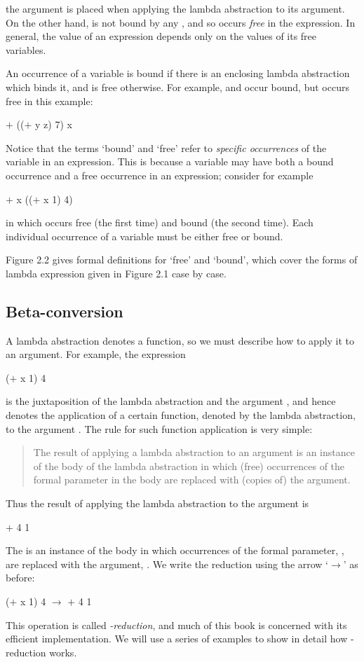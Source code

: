 \noindent the
argument  is placed when applying the lambda abstraction to its argument.
On the other hand,  is not bound by any , and so occurs \textit{free} in the
expression. In general, the value of an expression depends only on the values
of its free variables.

An occurrence of a variable is bound if there is an enclosing lambda
abstraction which binds it, and is free otherwise. For example,  and  occur
bound, but  occurs free in this example:
\begin{mlcoded}
	$+$ (($+$ y z) 7) x
\end{mlcoded}
Notice that the terms `bound' and `free' refer to \textit{specific occurrences} of the
variable in an expression. This is because a variable may have both a bound
occurrence and a free occurrence in an expression; consider for example
\begin{mlcoded}
	$+$ x (($+$ x 1) 4)
\end{mlcoded}
in which  occurs free (the first time) and bound (the second time). Each
individual occurrence of a variable must be either free or bound.

Figure 2.2 gives formal definitions for `free' and `bound', which cover the
forms of lambda expression given in Figure 2.1 case by case.

\subsection{Beta-conversion}

A lambda abstraction denotes a function, so we must describe how to apply it
to an argument. For example, the expression
\begin{mlcoded}
	($+$ x 1) 4
\end{mlcoded}
is the juxtaposition of the lambda abstraction  and the argument ,
and hence denotes the application of a certain function, denoted by the
lambda abstraction, to the argument . The rule for such function application
is very simple:
\begin{quote}
	The result of applying a lambda abstraction to an argument is an instance of
	the body of the lambda abstraction in which (free) occurrences of the
	formal parameter in the body are replaced with (copies of) the argument.
\end{quote}
Thus the result of applying the lambda abstraction  to the
argument  is
\begin{mlcoded}
    $+$ 4 1
\end{mlcoded}
The  is an instance of the body  in which occurrences of the
formal parameter, , are replaced with the argument, . We write the
reduction using the arrow `$\rightarrow$' as before:
\begin{mlcoded}
	($+$ x 1) 4 $\rightarrow$ $+$ 4 1
\end{mlcoded}
This operation is called \textit{\tb{}-reduction}, and much of this book is concerned with
its efficient implementation. We will use a series of examples to show in detail
how \tb{}-reduction works.

